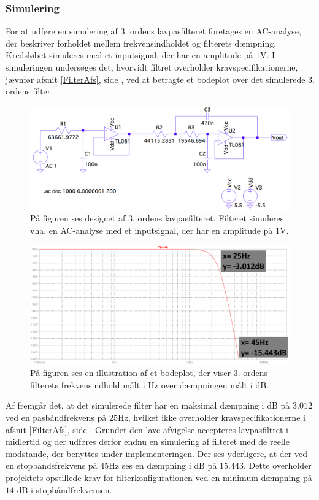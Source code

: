 \subsubsection{Simulering}
For at udføre en simulering af $3$. ordens lavpasfilteret foretages en AC-analyse, der beskriver forholdet mellem frekvensindholdet og filterets dæmpning. Kredsløbet simuleres med et inputsignal, der har en amplitude på $1$V. I simuleringen undersøges det, hvorvidt filtret overholder kravspecifikationerne, jævnfør afsnit \ref{FilterAfs}, side \pageref{FilterAfs}, ved at betragte et bodeplot over det simulerede $3$. ordens filter.
\begin{figure}[H]
	\centering
	\includegraphics[scale=0.35]{figures/cProblemloesning/Lavpasfilter_LTspice.PNG}
	\caption{På figuren ses designet af $3$. ordens lavpasfilteret. Filteret simuleres vha. en AC-analyse med et inputsignal, der har en amplitude på $1$V.}
	\label{fig:lavpasfilter_LTspice}
\end{figure}
\begin{figure}[H]
	\centering
	\includegraphics[scale=0.38]{figures/cProblemloesning/Lavpasfiltergraf_LTspice2.PNG}
	\caption{På figuren ses en illustration af et bodeplot, der viser $3$. ordens filterets frekvensindhold målt i Hz over dæmpningen målt i dB.}
	\label{fig:lavpasfiltergraf_LTspice1}
\end{figure}
\noindent Af  fremgår det, at det simulerede filter har en maksimal dæmpning i dB på $3.012$ ved en pasbåndfrekvens på $25$Hz, hvilket ikke overholder kravspecifikationerne i afsnit \ref{FilterAfs}, side \pageref{FilterAfs}. Grundet den lave afvigelse accepteres lavpasfiltret i midlertid og der udføres derfor endnu en simulering af filteret med de reelle modstande, der benyttes under implementeringen. Der ses yderligere, at der ved en stopbåndsfrekvens på $45$Hz ses en dæmpning i dB på $15.443$. Dette overholder projektets opstillede krav for filterkonfigurationen ved en minimum dæmpning på $14$ dB i stopbåndfrekvensen.

